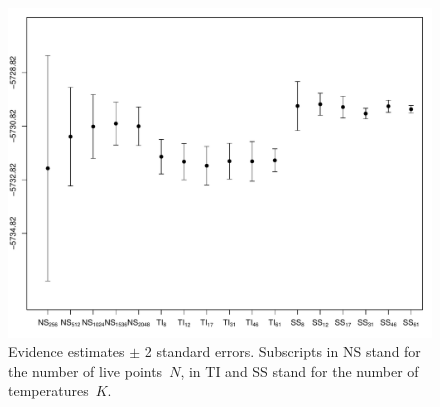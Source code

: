 \documentclass[aps,reprint,amsmath,amssymb,showpacs,showkeys]{revtex4-1}%
\newcommand{\jv}[1]{\textcolor{cyan}{JV: #1}}
\begin{document}
\begin{figure}[]
	\centering 
	\includegraphics[scale=0.38,clip=true,angle=0]{ligo_data_results.pdf}
	\caption{Evidence estimates $\pm$ 2 standard errors.  Subscripts in NS stand for the number of live points~$N$, in TI and SS stand for the number of temperatures~$K$.}
	\label{fig3}
\end{figure}





\end{document}
